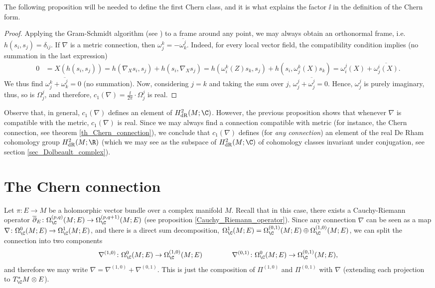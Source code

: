 The following proposition will be needed to define the first Chern class, and it is what explains the factor \(\ii\) in the definition of the Chern form.
\begin{proof}
    Applying the Gram-Schmidt algorithm (see \parencite[Lemma 8.3]{lee_introSM}) to a frame around any point, we may always obtain an orthonormal frame, i.e. \(h(s_i, s_j)=\delta_{ij}\). If \(\nabla\) is a metric connection, then \(\omega^k_j=-\overline{\omega^j_k}\). Indeed, for every local vector field, the compatibility condition implies (no summation in the last expression)
    \begin{align*}
        0 & = X(h(s_i, s_j)) = h(\nabla_X s_i, s_j) + h(s_i,\nabla_X s_j) = h(\omega^k_i(Z)s_k, s_j)+h(s_i, \omega^k_j(X)s_k) = \omega^j_i(X)+\overline{\omega^i_j(X)}. 
    \end{align*}
    We thus find \(\omega^k_j+\overline{\omega^j_k}=0\) (no summation). Now, considering \(j=k\) and taking the sum over \(j\), \(\omega^j_j+\overline{\omega^j_j}=0\). Hence, \(\omega^j_j\) is purely imaginary, thus, so is \(\Omega^j_j\), and therefore, \(c_1(\nabla)=\frac{\ii}{2 \pi} \cdot \Omega_j^j\) is real.
\end{proof}

Observe that, in general, \(c_1(\nabla)\) defines an element of \(H^2_{\mathrm{dR}}(M;\C)\). However, the previous proposition shows that whenever \(\nabla\) is compatible with the metric, \(c_1(\nabla)\) is real. Since we may always find a connection compatible with metric (for instance, the Chern connection, see theorem \ref{th_Chern_connection}), we conclude that \(c_1(\nabla)\) defines (for \textit{any connection}) an element of the real De Rham cohomology group \(H^2_{\mathrm{dR}}(M;\R)\) (which we may see as the subspace of \(H^2_{\mathrm{dR}}(M;\C)\) of cohomology classes invariant under conjugation, see section \ref{sec_Dolbeault_complex}). 


\section{The Chern connection}
Let \(\pi\colon E \to M\) be a holomorphic vector bundle over a complex manifold \(M\). Recall that in this case, there exists a Cauchy-Riemann operator \(\overline \partial_E\colon \Omega_\C^{(p,q)}(M;E) \to \Omega_\C^{(p,q+1)}(M;E)\) (see proposition \ref{Cauchy_Riemann_operator}). Since any connection \(\nabla\) can be seen as a map \(\nabla\colon \Omega_\C^0(M;E)\to \Omega_\C^1(M;E)\), and there is a direct sum decomposition, \(\Omega^1_\C(M;E)=\Omega^{(0,1)}_\C(M;E)\oplus \Omega_\C^{(1,0)}(M;E)\), we can split the connection into two components 
\[
\nabla^{(1,0)}\colon \Omega_\C^0 (M;E) \to \Omega_\C^{(1,0)}(M;E) \hspace{1.5 cm}
\nabla^{(0,1)}\colon \Omega_\C^0(M;E)\to \Omega_\C^{(0,1)}(M;E),
\]
and therefore we may write \(\nabla=\nabla^{(1,0)}+\nabla^{(0,1)}\). This is just the composition of \(\Pi^{(1,0)}\) and \(\Pi^{(0,1)}\) with \(\nabla\) (extending each projection to \(T_\C^*M \otimes E\)).

